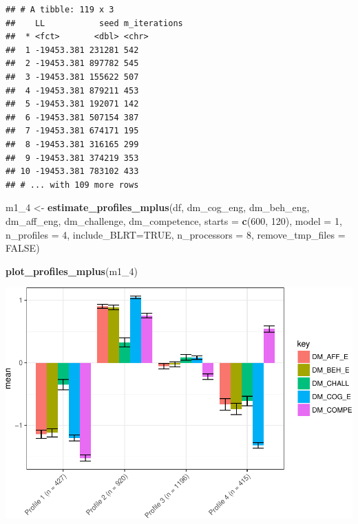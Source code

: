 \documentclass[]{msu-thesis}
\newenvironment{Shaded}{\begin{snugshade}}{\end{snugshade}}
\newcommand{\KeywordTok}[1]{\textcolor[rgb]{0.13,0.29,0.53}{\textbf{#1}}}
\newcommand{\DataTypeTok}[1]{\textcolor[rgb]{0.13,0.29,0.53}{#1}}
\newcommand{\DecValTok}[1]{\textcolor[rgb]{0.00,0.00,0.81}{#1}}
\newcommand{\StringTok}[1]{\textcolor[rgb]{0.31,0.60,0.02}{#1}}
\newcommand{\OtherTok}[1]{\textcolor[rgb]{0.56,0.35,0.01}{#1}}
\newcommand{\NormalTok}[1]{#1}
\theoremstyle{definition}
\theoremstyle{definition}
\theoremstyle{definition}
\theoremstyle{remark}
\begin{document}
\begin{verbatim}
## # A tibble: 119 x 3
##    LL           seed m_iterations
##  * <fct>       <dbl> <chr>       
##  1 -19453.381 231281 542         
##  2 -19453.381 897782 545         
##  3 -19453.381 155622 507         
##  4 -19453.381 879211 453         
##  5 -19453.381 192071 142         
##  6 -19453.381 507154 387         
##  7 -19453.381 674171 195         
##  8 -19453.381 316165 299         
##  9 -19453.381 374219 353         
## 10 -19453.381 783102 433         
## # ... with 109 more rows
\end{verbatim}

\begin{Shaded}
\begin{Highlighting}[]
\NormalTok{m1_}\DecValTok{4}\NormalTok{ <-}\StringTok{ }\KeywordTok{estimate_profiles_mplus}\NormalTok{(df,  }
\NormalTok{                             dm_cog_eng, dm_beh_eng, dm_aff_eng, dm_challenge, dm_competence,}
                             \DataTypeTok{starts =} \KeywordTok{c}\NormalTok{(}\DecValTok{600}\NormalTok{, }\DecValTok{120}\NormalTok{),}
                             \DataTypeTok{model =} \DecValTok{1}\NormalTok{,}
                             \DataTypeTok{n_profiles =} \DecValTok{4}\NormalTok{,}
                             \DataTypeTok{include_BLRT=}\OtherTok{TRUE}\NormalTok{,}
                             \DataTypeTok{n_processors =} \DecValTok{8}\NormalTok{, }\DataTypeTok{remove_tmp_files =} \OtherTok{FALSE}\NormalTok{)}

\KeywordTok{plot_profiles_mplus}\NormalTok{(m1_}\DecValTok{4}\NormalTok{)}
\end{Highlighting}
\end{Shaded}

\includegraphics{rosenberg-dissertation_files/figure-latex/spec-solutions-model1-2.pdf}
\end{document}
